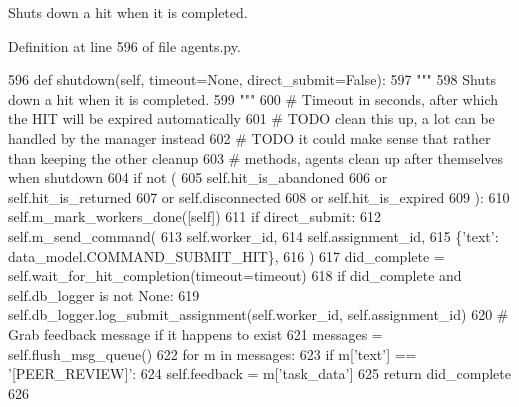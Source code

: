 \begin{DoxyVerb}Shuts down a hit when it is completed.
\end{DoxyVerb}
 

Definition at line 596 of file agents.\+py.


\begin{DoxyCode}
596     \textcolor{keyword}{def }shutdown(self, timeout=None, direct\_submit=False):
597         \textcolor{stringliteral}{"""}
598 \textcolor{stringliteral}{        Shuts down a hit when it is completed.}
599 \textcolor{stringliteral}{        """}
600         \textcolor{comment}{# Timeout in seconds, after which the HIT will be expired automatically}
601         \textcolor{comment}{# TODO clean this up, a lot can be handled by the manager instead}
602         \textcolor{comment}{# TODO it could make sense that rather than keeping the other cleanup}
603         \textcolor{comment}{# methods, agents clean up after themselves when shutdown}
604         \textcolor{keywordflow}{if} \textcolor{keywordflow}{not} (
605             self.hit\_is\_abandoned
606             \textcolor{keywordflow}{or} self.hit\_is\_returned
607             \textcolor{keywordflow}{or} self.disconnected
608             \textcolor{keywordflow}{or} self.hit\_is\_expired
609         ):
610             self.m\_mark\_workers\_done([self])
611             \textcolor{keywordflow}{if} direct\_submit:
612                 self.m\_send\_command(
613                     self.worker\_id,
614                     self.assignment\_id,
615                     \{\textcolor{stringliteral}{'text'}: data\_model.COMMAND\_SUBMIT\_HIT\},
616                 )
617             did\_complete = self.wait\_for\_hit\_completion(timeout=timeout)
618             \textcolor{keywordflow}{if} did\_complete \textcolor{keywordflow}{and} self.db\_logger \textcolor{keywordflow}{is} \textcolor{keywordflow}{not} \textcolor{keywordtype}{None}:
619                 self.db\_logger.log\_submit\_assignment(self.worker\_id, self.assignment\_id)
620             \textcolor{comment}{# Grab feedback message if it happens to exist}
621             messages = self.flush\_msg\_queue()
622             \textcolor{keywordflow}{for} m \textcolor{keywordflow}{in} messages:
623                 \textcolor{keywordflow}{if} m[\textcolor{stringliteral}{'text'}] == \textcolor{stringliteral}{'[PEER\_REVIEW]'}:
624                     self.feedback = m[\textcolor{stringliteral}{'task\_data'}]
625             \textcolor{keywordflow}{return} did\_complete
626 
\end{DoxyCode}
\mbox{\label{classparlai_1_1mturk_1_1core_1_1dev_1_1agents_1_1MTurkAgent_ad256094580f1dd63071a31cfe5c4ba98}} 
